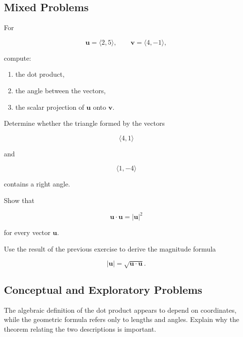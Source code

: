 \subsection*{Mixed Problems}

\begin{exercise}
For

\[
\mathbf{u}
=
\langle 2,5\rangle,
\qquad
\mathbf{v}
=
\langle 4,-1\rangle,
\]

compute:

\begin{enumerate}
\item[(a)] the dot product,
\item[(b)] the angle between the vectors,
\item[(c)] the scalar projection of $\mathbf{u}$ onto $\mathbf{v}$.
\end{enumerate}
\end{exercise}

\begin{exercise}
Determine whether the triangle formed by the vectors

\[
\langle 4,1\rangle
\]

and

\[
\langle 1,-4\rangle
\]

contains a right angle.
\end{exercise}

\begin{exercise}
Show that

\[
\mathbf{u}\cdot\mathbf{u}
=
|\mathbf{u}|^2
\]

for every vector $\mathbf{u}$.
\end{exercise}

\begin{exercise}
Use the result of the previous exercise to derive the magnitude formula

\[
|\mathbf{u}|
=
\sqrt{\mathbf{u}\cdot\mathbf{u}}.
\]
\end{exercise}

\subsection*{Conceptual and Exploratory Problems}

\begin{exercise}
The algebraic definition of the dot product appears to depend on
coordinates, while the geometric formula refers only to lengths and
angles. Explain why the theorem relating the two descriptions is
important.
\end{exercise}

